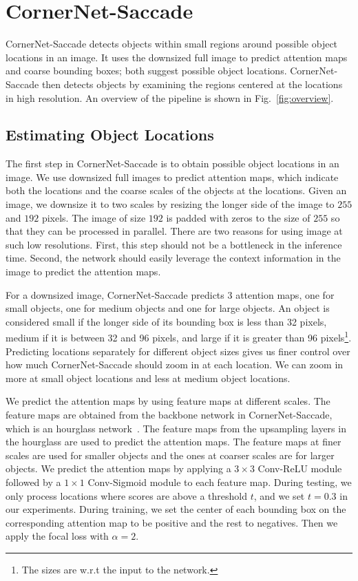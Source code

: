 \documentclass{bmvc2k}
\begin{document}
\section{CornerNet-Saccade}
CornerNet-Saccade detects objects within small regions around possible object locations in an image. It uses the downsized full image to predict attention maps and coarse bounding boxes; both suggest possible object locations. CornerNet-Saccade then detects objects by examining the regions centered at the locations in high resolution. An overview of the pipeline is shown in Fig.~\ref{fig:overview}. %

\subsection{Estimating Object Locations}
The first step in CornerNet-Saccade is to obtain possible object locations in an image. We use downsized full images to predict attention maps, which indicate both the locations and the coarse scales of the objects at the locations. Given an image, we downsize it to two scales by resizing the longer side of the image to $255$ and $192$ pixels. The image of size $192$ is padded with zeros to the size of $255$ so that they can be processed in parallel. There are two reasons for using image at such low resolutions. First, this step should not be a bottleneck in the inference time. Second, the network should easily leverage the context information in the image to predict the attention maps.

For a downsized image, CornerNet-Saccade predicts 3 attention maps, one for small objects, one for medium objects and one for large objects. An object is considered small if the longer side of its bounding box is less than 32 pixels, medium if it is between 32 and 96 pixels, and large if it is greater than 96 pixels\footnote{The sizes are w.r.t the input to the network.}. Predicting locations separately for different object sizes gives us finer control over how much CornerNet-Saccade should zoom in at each location. We can zoom in more at small object locations and less at medium object locations.

We predict the attention maps by using feature maps at different scales. The feature maps are obtained from the backbone network in CornerNet-Saccade, which is an hourglass network~\cite{newell2016stacked}. The feature maps from the upsampling layers in the hourglass are used to predict the attention maps. The feature maps at finer scales are used for smaller objects and the ones at coarser scales are for larger objects. We predict the attention maps by applying a $3 \times 3$ Conv-ReLU module followed by a $1 \times 1$ Conv-Sigmoid module to each feature map. During testing, we only process locations where scores are above a threshold $t$, and we set $t = 0.3$ in our experiments. During training, we set the center of each bounding box on the corresponding attention map to be positive and the rest to negatives. Then we apply the focal loss with $\alpha = 2$.
\end{document}
